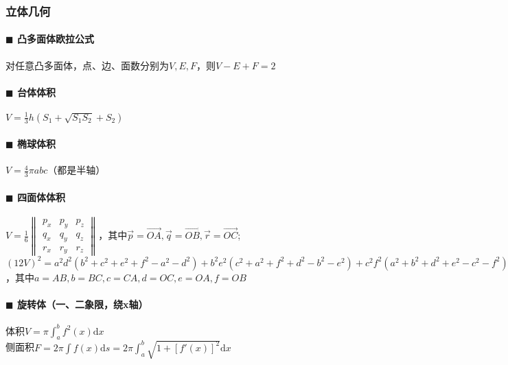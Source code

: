 \subsubsection{立体几何}
\paragraph{$\blacksquare$ 凸多面体欧拉公式}
对任意凸多面体，点、边、面数分别为$V, E, F$，则$V-E+F=2$
\paragraph{$\blacksquare$ 台体体积}
$V=\frac{1}{3}h(S_1+\sqrt {S_1S_2}+S_2)$
\paragraph{$\blacksquare$ 椭球体积}
$V=\frac{4}{3} \pi abc$（都是半轴）
\paragraph{$\blacksquare$ 四面体体积\\}
$V=\frac{1}{6} \begin{Vmatrix} p_x & p_y & p_z\\ q_x & q_y & q_z\\ r_x & r_y & r_z \end{Vmatrix}$，其中$\vec p=\overrightarrow{OA}, \vec q=\overrightarrow{OB}, \vec r=\overrightarrow{OC}$;\\
$(12V)^2=a^2d^2(b^2+c^2+e^2+f^2-a^2-d^2)+b^2e^2(c^2+a^2+f^2+d^2-b^2-e^2)+c^2f^2(a^2+b^2+d^2+e^2-c^2-f^2)-a^2b^2c^2-a^2e^2f^2-d^2b^2f^2-d^2e^2c^2$，其中$a=AB,b=BC,c=CA,d=OC,e=OA,f=OB$
\paragraph{$\blacksquare$ 旋转体（一、二象限，绕x轴）}
体积$V=\pi \int_{a}^{b} f^2(x) \mathrm{d} x$\\
侧面积$F=2\pi \int f(x) \mathrm{d} s=2\pi \int_{a}^{b} \sqrt{1+[f'(x)]^2} \mathrm{d} x$\\
